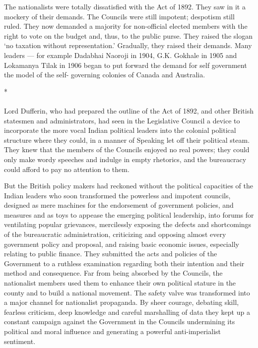 The nationalists were totally dissatisfied with the Act of 1892. They saw in it a mockery of their demands. The Councils were still impotent; despotism still ruled. They now demanded a majority for non-official elected members with the right to vote on the budget and, thus, to the public purse. They raised the slogan `no taxation without representation.' Gradually, they raised their demands. Many leaders — for example Dadabhai Naoroji in 1904, G.K. Gokhale in 1905 and Lokamanya Tilak in 1906 began to put forward the demand for self government the model of the self- governing colonies of Canada and Australia.

\begin{center}*\end{center}

\paragraph*{}


Lord Dufferin, who had prepared the outline of the Act of 1892, and other British statesmen and administrators, had seen in the Legislative Council a device to incorporate the more vocal Indian political leaders into the colonial political structure where they could, in a manner of Speaking let off their political steam. They knew that the members of the Councils enjoyed no real powers; they could only make wordy speeches and indulge in empty rhetorics, and the bureaucracy could afford to pay no attention to them.

But the British policy makers had reckoned without the political capacities of the Indian leaders who soon transformed the powerless and impotent councils, designed as mere machines for the endorsement of government policies, and measures and as toys to appease the emerging political leadership, into forums for ventilating popular grievances, mercilessly exposing the defects and shortcomings of the bureaucratic administration, criticizing and opposing almost every government policy and proposal, and raising basic economic issues, especially relating to public finance. They submitted the acts and policies of the Government to a ruthless examination regarding both their intention and their method and consequence. Far from being absorbed by the Councils, the nationalist members used them to enhance their own political stature in the county and to build a national movement. The safety valve was transformed into a major channel for nationalist propaganda. By sheer courage, debating skill, fearless criticism, deep knowledge and careful marshalling of data they kept up a constant campaign against the Government in the Councils undermining its political and moral influence and generating a powerful anti-imperialist sentiment.

